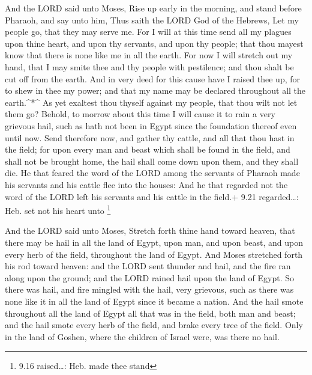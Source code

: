  And the LORD said unto Moses, Rise up early in the
morning, and stand before Pharaoh, and say unto him, Thus saith the LORD
God of the Hebrews, Let my people go, that they may serve me.
 For I will at this time send all my plagues upon thine
heart, and upon thy servants, and upon thy people; that thou mayest know
that there is none like me in all the earth.  For now I
will stretch out my hand, that I may smite thee and thy people with
pestilence; and thou shalt be cut off from the earth.  And
in very deed for this cause have I raised thee up, for to shew in thee
my power; and that my name may be declared throughout all the
earth.\^{}*\^{}  As yet exaltest thou thyself against my
people, that thou wilt not let them go?  Behold, to morrow
about this time I will cause it to rain a very grievous hail, such as
hath not been in Egypt since the foundation thereof even until now.
 Send therefore now, and gather thy cattle, and all that
thou hast in the field; for upon every man and beast which shall be
found in the field, and shall not be brought home, the hail shall come
down upon them, and they shall die.  He that feared the
word of the LORD among the servants of Pharaoh made his servants and his
cattle flee into the houses:  And he that regarded not the
word of the LORD left his servants and his cattle in the field.+ 9.21
regarded\ldots: Heb. set not his heart unto \footnote{9.16 raised\ldots:
  Heb. made thee stand}

 And the LORD said unto Moses, Stretch forth thine hand
toward heaven, that there may be hail in all the land of Egypt, upon
man, and upon beast, and upon every herb of the field, throughout the
land of Egypt.  And Moses stretched forth his rod toward
heaven: and the LORD sent thunder and hail, and the fire ran along upon
the ground; and the LORD rained hail upon the land of Egypt.
 So there was hail, and fire mingled with the hail, very
grievous, such as there was none like it in all the land of Egypt since
it became a nation.  And the hail smote throughout all the
land of Egypt all that was in the field, both man and beast; and the
hail smote every herb of the field, and brake every tree of the field.
 Only in the land of Goshen, where the children of Israel
were, was there no hail.

